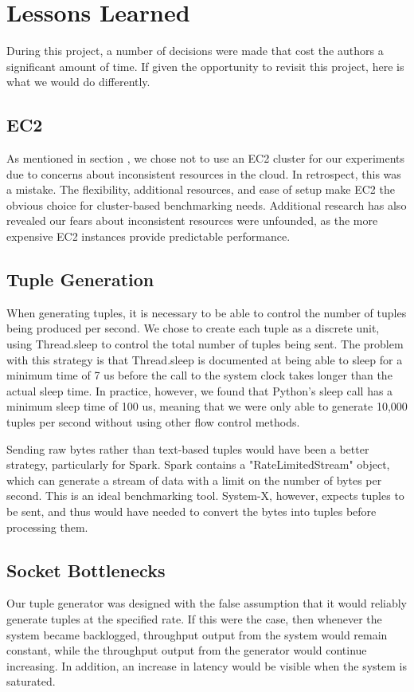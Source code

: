 \section{Lessons Learned}
\label{sec:lessons}
During this project, a number of decisions were made that cost the authors a significant amount of time.  If given the opportunity to revisit this project, here is what we would do differently.

\subsection{EC2}
As mentioned in section , we chose not to use an EC2 cluster for our experiments due to concerns about inconsistent resources in the cloud.  In retrospect, this was a mistake.  The flexibility, additional resources, and ease of setup make EC2 the obvious choice for cluster-based benchmarking needs.  Additional research has also revealed our fears about inconsistent resources were unfounded, as the more expensive EC2 instances provide predictable performance.

\subsection{Tuple Generation}
When generating tuples, it is necessary to be able to control the number of tuples being produced per second.  We chose to create each tuple as a discrete unit, using Thread.sleep to control the total number of tuples being sent.  The problem with this strategy is that Thread.sleep is documented at being able to sleep for a minimum time of 7 us before the call to the system clock takes longer than the actual sleep time.  In practice, however, we found that Python's sleep call has a minimum sleep time of 100 us, meaning that we were only able to generate 10,000 tuples per second without using other flow control methods.

Sending raw bytes rather than text-based tuples would have been a better strategy, particularly for Spark.  Spark contains a "RateLimitedStream" object, which can generate a stream of data with a limit on the number of bytes per second.  This is an ideal benchmarking tool.  System-X, however, expects tuples to be sent, and thus would have needed to convert the bytes into tuples before processing them.

\subsection{Socket Bottlenecks}
Our tuple generator was designed with the false assumption that it would reliably generate tuples at the specified rate.  If this were the case, then whenever the system became backlogged, throughput output from the system would remain constant, while the throughput output from the generator would continue increasing.  In addition, an increase in latency would be visible when the system is saturated.


